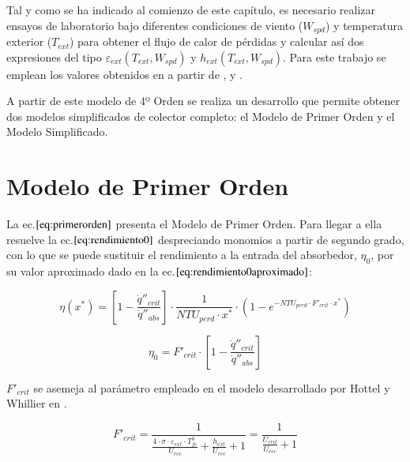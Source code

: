 Tal y como se ha indicado al comienzo de este capítulo, es necesario realizar ensayos de laboratorio bajo diferentes condiciones de viento (\(W_{spd}\)) y temperatura exterior (\(T_{ext}\)) para obtener el flujo de calor de pérdidas y calcular así dos expresiones del tipo \(\varepsilon_{ext}(T_{ext},W_{spd})\) y \(h_{ext}(T_{ext},W_{spd})\). Para este trabajo se emplean los valores obtenidos en \cite{barberofresnoDesarrolloModeloTeorico2018} a partir de \cite{burkholderHeatLossTesting2009}, \cite{burkholderHeatLossTestingSolel2008} y \cite{kutscherGenerationParabolicTrough2012}.

A partir de este modelo de 4º Orden se realiza un desarrollo que permite obtener dos modelos simplificados de colector completo: el Modelo de Primer Orden y el Modelo Simplificado.

\section{Modelo de Primer Orden}

La ec.\(\eqref{eq:primerorden}\) presenta el Modelo de Primer Orden. Para llegar a ella resuelve la ec.\(\eqref{eq:rendimiento0}\) despreciando monomios a partir de segundo grado, con lo que se puede sustituir el rendimiento a la entrada del absorbedor, \(\eta_{0}\), por su valor aproximado dado en la ec.\(\eqref{eq:rendimiento0aproximado}\):

\begin{equation}
    \eta(x^{*}) = \left[1-\frac{\dot q''_{crit}}{\dot q''_{abs}}\right] \cdot \frac{1}{NTU_{perd} \cdot x^{*}} \cdot \left(1-e^{-NTU_{perd}\cdot F'_{crit}\cdot x^{*}}\right) 
    \label{eq:primerorden}
\end{equation}

\begin{equation}
    \eta_{0} = F'_{crit} \cdot \left[1-\frac{\dot q''_{crit}}{\dot q''_{abs}}\right] 
    \label{eq:rendimiento0aproximado}
\end{equation}

 \(F'_{crit}\) se asemeja al parámetro empleado en el modelo desarrollado por Hottel y Whillier en \cite{hottelEvaluationFlatplateSolar1955}.

\begin{equation}
    F'_{crit} = \frac{1}{\frac{4 \cdot \sigma \cdot \varepsilon_{ext} \cdot T^{3}_{fe}}{U_{rec}} + \frac{h_{ext}}{U_{rec}} +1} = \frac{1}{\frac{U_{crit}}{U_{rec}}+1}
    \label{eq:fcrit}
\end{equation}

